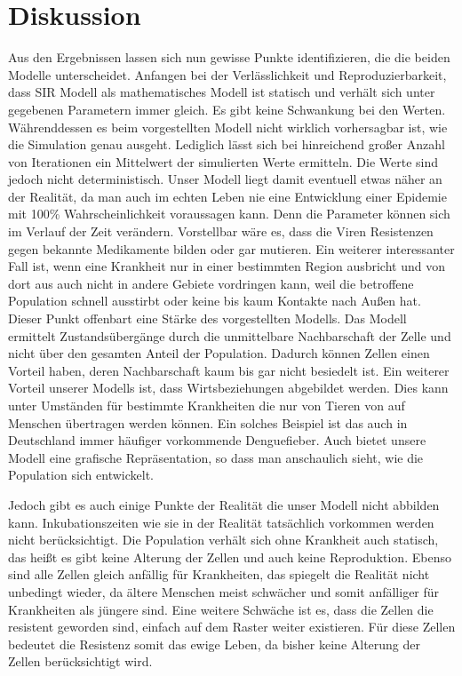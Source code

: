 \documentclass[10pt,twocolumn]{scrartcl}
\begin{document}
\section*{Diskussion}
Aus den Ergebnissen lassen sich nun gewisse Punkte identifizieren, die die beiden Modelle unterscheidet.
Anfangen bei der Verlässlichkeit und Reproduzierbarkeit, dass SIR Modell als mathematisches Modell ist statisch und verhält sich unter gegebenen Parametern immer gleich. Es gibt keine Schwankung bei den Werten. Währenddessen es beim vorgestellten Modell nicht wirklich vorhersagbar ist, wie die Simulation genau ausgeht. Lediglich lässt sich bei hinreichend großer Anzahl von Iterationen ein Mittelwert der simulierten Werte ermitteln. Die Werte sind jedoch nicht deterministisch.
Unser Modell liegt damit eventuell etwas näher an der Realität, da man auch im echten Leben nie eine Entwicklung einer Epidemie mit 100\% Wahrscheinlichkeit voraussagen kann. Denn die Parameter können sich im Verlauf der Zeit verändern. Vorstellbar wäre es, dass die Viren Resistenzen gegen bekannte Medikamente bilden oder gar mutieren.
Ein weiterer interessanter Fall ist, wenn eine Krankheit nur in einer bestimmten Region ausbricht und von dort aus auch nicht in andere Gebiete vordringen kann, weil die betroffene Population schnell ausstirbt oder keine bis kaum Kontakte nach Außen hat. 
Dieser Punkt offenbart eine Stärke des vorgestellten Modells. Das Modell ermittelt Zustandsübergänge durch die unmittelbare Nachbarschaft der Zelle und nicht über den gesamten Anteil der Population.
Dadurch können Zellen einen Vorteil haben, deren Nachbarschaft kaum bis gar nicht besiedelt ist.
Ein weiterer Vorteil unserer Modells ist, dass Wirtsbeziehungen abgebildet werden. Dies kann unter Umständen für bestimmte Krankheiten die nur von Tieren von auf Menschen übertragen werden können. Ein solches Beispiel ist das auch in Deutschland immer häufiger vorkommende Denguefieber.
Auch bietet unsere Modell eine grafische Repräsentation, so dass man anschaulich sieht, wie die Population sich entwickelt.


Jedoch gibt es auch einige Punkte der Realität die unser Modell nicht abbilden kann. Inkubationszeiten wie sie in der Realität tatsächlich vorkommen werden nicht berücksichtigt. Die Population verhält sich ohne Krankheit auch statisch, das heißt es gibt keine Alterung der Zellen und auch keine Reproduktion. Ebenso sind alle Zellen gleich anfällig für Krankheiten, das spiegelt die Realität nicht unbedingt wieder, da ältere Menschen meist schwächer und somit anfälliger für Krankheiten als jüngere sind.
Eine weitere Schwäche ist es, dass die Zellen die resistent geworden sind, einfach auf dem Raster weiter existieren. Für diese Zellen bedeutet die Resistenz somit das ewige Leben, da bisher keine Alterung der Zellen berücksichtigt wird. 
\end{document}
